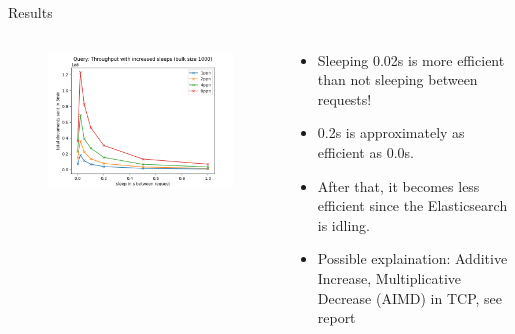 \documentclass[compress,aspectratio=169]{beamer}
\begin{document}
  \begin{frame}{Results}
    \begin{columns}
      \begin{column}{0.5\textwidth}
        \begin{figure}
          \includegraphics[height=0.9\textwidth]{./analysis/querythroughputsleep.png}
        \end{figure}
      \end{column}
      \begin{column}{0.5\textwidth}
        \begin{itemize}
          \item Sleeping 0.02s is more efficient than not sleeping between requests!
          \item 0.2s is approximately as efficient as 0.0s.
          \item After that, it becomes less efficient since the Elasticsearch is idling.
          \item Possible explaination: Additive Increase, Multiplicative Decrease (AIMD) in TCP, see report
        \end{itemize}
      \end{column}
    \end{columns}
  \end{frame}
\end{document}
